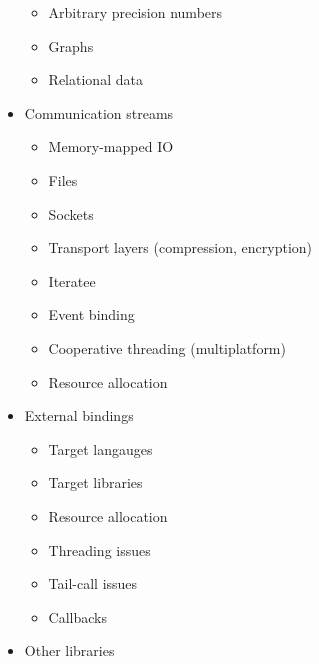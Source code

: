 \begin{itemize}
\begin{itemize}
  \item Arbitrary precision numbers

  \item Graphs

  \item Relational data

  \end{itemize}

\item Communication streams

  \begin{itemize}

  \item Memory-mapped IO

  \item Files

  \item Sockets

  \item Transport layers (compression, encryption)

  \item Iteratee

  \item Event binding

  \item Cooperative threading (multiplatform)

  \item Resource allocation

  \end{itemize}

\item External bindings

  \begin{itemize}

  \item Target langauges

  \item Target libraries

  \item Resource allocation

  \item Threading issues

  \item Tail-call issues

  \item Callbacks

  \end{itemize}

\item Other libraries


\end{itemize}
